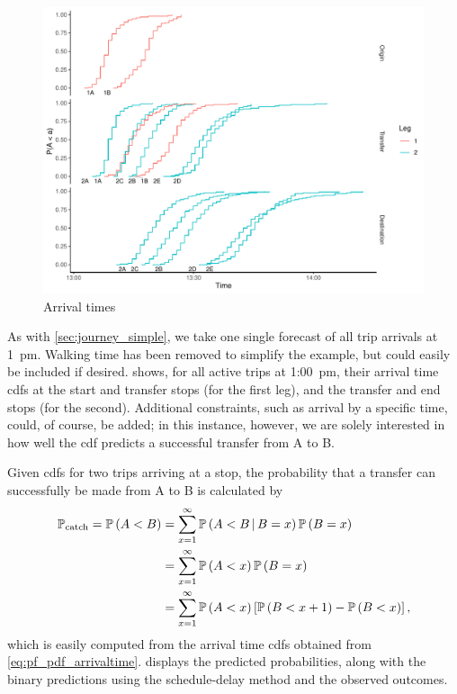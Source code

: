 \begin{knitrout}\small
{}\color{fgcolor}\begin{figure}

{\centering \includegraphics[width=\textwidth]{figure/eta_journey_transfer_graph-1} 

}

\caption[Arrival times]{Arrival times}\label{fig:eta_journey_transfer_graph}
\end{figure}


\end{knitrout}


As with \cref{sec:journey_simple}, we take one single forecast of all trip arrivals at 1~pm. Walking time has been removed to simplify the example, but could easily be included if desired.  shows, for all active trips at  1:00~pm, their arrival time \glspl{cdf} at the start and transfer stops (for the first leg), and the transfer and end stops (for the second). Additional constraints, such as arrival by a specific time, could, of course, be added; in this instance, however, we are solely interested in how well the \pf{} \gls{cdf} predicts a successful transfer from A to B.


Given \glspl{cdf} for two trips arriving at a stop, the probability that a transfer can successfully be made from A to B is calculated by
\begin{equation}
\label{eq:eta_total_prob}
\begin{split}
\mathbb{P}_\text{catch} =
\mathbb{P}\left(A < B\right) &= \sum_{x=1}^{\infty} \mathbb{P}\left(A < B\,|\,B = x\right)\mathbb{P}\left(B=x\right) \\
  &= \sum_{x=1}^\infty
    \mathbb{P}\left(A < x\right) \mathbb{P}\left(B=x\right) \\
  &= \sum_{x=1}^\infty
    \mathbb{P}\left(A < x\right) \left[
      \mathbb{P}\left(B < x + 1\right) - \mathbb{P}\left(B < x\right)
    \right],
\end{split}
\end{equation}
which is easily computed from the arrival time \glspl{cdf} obtained from \cref{eq:pf_pdf_arrivaltime}.  displays the predicted probabilities, along with the binary predictions using the schedule-delay method and the observed outcomes.


